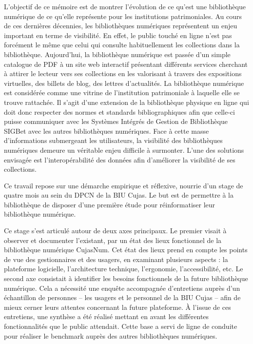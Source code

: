 L'objectif de ce mémoire est de montrer l'évolution de ce qu'est une bibliothèque numérique de ce qu'elle représente pour les institutions patrimoniales. Au cours de ces dernières décennies, les bibliothèques numériques représentent un enjeu important en terme de visibilité. En effet, le public touché en ligne n'est pas forcément le même que celui qui consulte habituellement les collections dans la bibliothèque. Aujourd'hui, la bibliothèque numérique est passée d'un simple catalogue de PDF à un site web interactif présentant différents services cherchant à attirer le lecteur vers ses collections en les valorisant à travers des expositions virtuelles, des billets de blog, des lettres d'actualités. La bibliothèque numérique est considérée comme une vitrine de l'institution patrimoniale à laquelle elle se trouve rattachée. Il s'agit d'une extension de la bibliothèque physique en ligne qui doit donc respecter des normes et standards bibliographiques afin que celle-ci puisse communiquer avec les Systèmes Intégrés de Gestion de Bibliothèque \ac{SIGB}et avec les autres bibliothèques numériques. Face à cette masse d'informations submergeant les utilisateurs, la visibilité des bibliothèques numériques demeure un véritable enjeu difficile à surmonter. L'une des solutions envisagée est l'interopérabilité des données afin d'améliorer la visibilité de ses collections.
\bigskip

Ce travail repose sur une démarche empirique et réflexive, nourrie d'un stage de quatre mois au sein du \ac{DPCN} de la \ac{BIU Cujas}. Le but est de permettre à la bibliothèque de disposer d'une première étude pour réinformatiser leur bibliothèque numérique.

Ce stage s'est articulé autour de deux axes principaux. Le premier visait à observer et documenter l'existant, par un état des lieux fonctionnel de la bibliothèque numérique CujasNum. Cet état des lieux prend en compte les points de vue des gestionnaires et des usagers, en examinant plusieurs aspects : la plateforme logicielle, l'architecture technique, l'ergonomie, l'accessibilité, etc. Le second axe consistait à identifier les besoins fonctionnels de la future bibliothèque numérique. Cela a nécessité une enquête accompagnée d'entretiens auprès d'un échantillon de personnes -- les usagers et le personnel de la \ac{BIU Cujas} -- afin de mieux cerner leurs attentes concernant la future plateforme. À l'issue de ces entretiens, une synthèse a été réalisé mettant en avant les différentes fonctionnalités que le public attendait. Cette base a servi de ligne de conduite pour réaliser le benchmark auprès des autres bibliothèques numériques.

